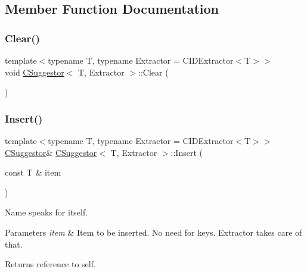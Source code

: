 \subsection{Member Function Documentation}
\mbox{\label{class_c_suggestor_aed01dde97e7f7e316e79b0b05a238ac3}} 
\subsubsection{\texorpdfstring{Clear()}{Clear()}}
{\footnotesize\ttfamily template$<$typename T, typename Extractor = C\+I\+D\+Extractor$<$\+T$>$$>$ \\
void \mbox{\hyperlink{class_c_suggestor}{C\+Suggestor}}$<$ T, Extractor $>$\+::Clear (\begin{DoxyParamCaption}{ }\end{DoxyParamCaption})\hspace{0.3cm}{\ttfamily [inline]}}

\mbox{\label{class_c_suggestor_a7dcad2589a3752d147b20c5fc208a655}} 
\subsubsection{\texorpdfstring{Insert()}{Insert()}}
{\footnotesize\ttfamily template$<$typename T, typename Extractor = C\+I\+D\+Extractor$<$\+T$>$$>$ \\
\mbox{\hyperlink{class_c_suggestor}{C\+Suggestor}}\& \mbox{\hyperlink{class_c_suggestor}{C\+Suggestor}}$<$ T, Extractor $>$\+::Insert (\begin{DoxyParamCaption}\item[{const T \&}]{item }\end{DoxyParamCaption})\hspace{0.3cm}{\ttfamily [inline]}}

Name speaks for itself. 
\begin{DoxyParams}{Parameters}
{\em item} & Item to be inserted. No need for keys. Extractor takes care of that. \\
\hline
\end{DoxyParams}
\begin{DoxyReturn}{Returns}
reference to self. 
\end{DoxyReturn}
\mbox{\label{class_c_suggestor_a2ec0c6c48be4916eae4b939f23759a53}} 
